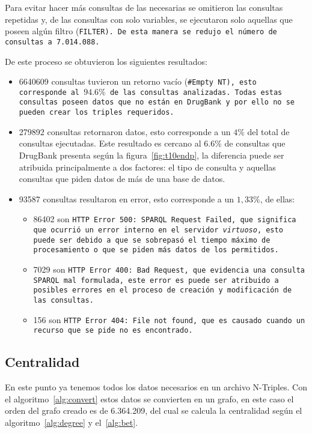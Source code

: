 Para evitar hacer más consultas de las necesarias se omitieron las consultas
repetidas y, de las consultas con solo variables, se ejecutaron solo aquellas
que poseen algún filtro (\tt{FILTER}). De esta manera se redujo el número de
consultas a 7.014.088.

De este proceso se obtuvieron los siguientes resultados:
\begin{itemize}
  \item
    6640609 consultas tuvieron un retorno vacío (\tt{\#Empty NT}), esto
    corresponde al $94.6\%$ de las consultas analizadas. Todas estas consultas
    poseen datos que no están en DrugBank y por ello no se pueden crear los
    triples requeridos.
  \item
    279892 consultas retornaron datos, esto corresponde a un $4\%$ del total de
    consultas ejecutadas. Este resultado es cercano al $6.6\%$ de consultas que
    DrugBank presenta según la figura~\ref{fig:t10endp}, la diferencia puede ser
    atribuida principalmente a dos factores: el tipo de consulta y aquellas
    consultas que piden datos de más de una base de datos.
  \item
    93587 consultas resultaron en error, esto corresponde a un $1,33\%$, de
    ellas:
    \begin{itemize}
      \item
        86402 son \tt{HTTP Error 500: SPARQL Request Failed}, que significa que
        ocurrió un error interno en el servidor \emph{virtuoso}, esto puede ser
        debido a que se sobrepasó el tiempo máximo de procesamiento o que se
        piden más datos de los permitidos.
      \item 
        7029 son \tt{HTTP Error 400: Bad Request}, que evidencia una consulta
        SPARQL mal formulada, este error es puede ser atribuido a posibles
        errores en el proceso de creación y modificación de las consultas.
      \item
        156 son \tt{HTTP Error 404: File not found}, que es causado cuando un
        recurso que se pide no es encontrado.
    \end{itemize}
\end{itemize}

\subsection{Centralidad}\label{sec:res:cent}
En este punto ya tenemos todos los datos necesarios en un archivo N-Triples. Con
el algoritmo~\ref{alg:convert} estos datos se convierten en un grafo, en este
caso el orden del grafo creado es de 6.364.209, del cual se calcula la
centralidad según el algoritmo~\ref{alg:degree} y el~\ref{alg:bet}.

